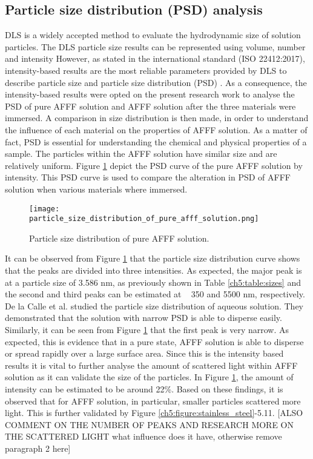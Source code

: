 \subsection{Particle size distribution (PSD) analysis} 
DLS is a widely accepted method to evaluate the hydrodynamic size of solution particles. The DLS particle size results can be represented using volume, number and intensity However, as stated in the international standard (ISO 22412:2017), intensity-based results are the most reliable parameters provided by DLS to describe particle size and particle size distribution (PSD) \cite{bellamy1980infrared}. As a consequence, the intensity-based results were opted on the present research work to analyse the PSD of pure AFFF solution and AFFF solution after the three materials were immersed. A comparison in size distribution is then made, in order to understand the influence of each material on the properties of AFFF solution. As a matter of fact, PSD is essential for understanding the chemical and physical properties of a sample. The particles within the AFFF solution have similar size and are relatively uniform. Figure \ref{ch5:figure:pure_afff} depict the PSD curve of the pure AFFF solution by intensity. This PSD curve is used to compare the alteration in PSD of AFFF solution when various materials where immersed. 

\begin{figure}[H]
    \centering
    \texttt{[image: particle\_size\_distribution\_of\_pure\_afff\_solution.png]}
    \caption{Particle size distribution of pure AFFF solution.}
    \label{ch5:figure:pure_afff}
\end{figure}

 It can be observed from Figure \ref{ch5:figure:pure_afff} that the particle size distribution curve shows that the peaks are divided into three intensities. As expected, the major peak is at a particle size of 3.586 nm, as previously shown in Table \ref{ch5:table:sizes} and the second and third peaks can be estimated at ~ 350 and 5500 nm, respectively. De la Calle et al. \cite{mudunkotuwa2014atr} studied the particle size distribution of aqueous solution. They demonstrated that the solution with narrow PSD is able to disperse easily. Similarly, it can be seen from Figure \ref{ch5:figure:pure_afff} that the first peak is very narrow. As expected, this is evidence that in a pure state, AFFF solution is able to disperse or spread rapidly over a large surface area. 
 Since this is the intensity based results it is vital to further analyse the amount of scattered light within AFFF solution as it can validate the size of the particles. In Figure \ref{ch5:figure:pure_afff}, the amount of intensity can be estimated to be around 22\%. Based on these findings, it is observed that for AFFF solution, in particular, smaller particles scattered more light. This is further validated by Figure \ref{ch5:figure:stainless_steel}-5.11.
 [ALSO COMMENT ON THE NUMBER OF PEAKS AND RESEARCH MORE ON THE SCATTERED LIGHT what influence does it have, otherwise remove paragraph 2 here]

